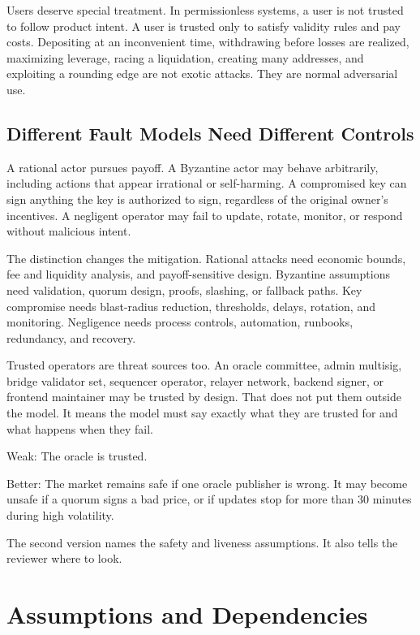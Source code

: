 Users deserve special treatment. In permissionless systems, a user is not trusted to follow product intent. A user is trusted only to satisfy validity rules and pay costs. Depositing at an inconvenient time, withdrawing before losses are realized, maximizing leverage, racing a liquidation, creating many addresses, and exploiting a rounding edge are not exotic attacks. They are normal adversarial use.

\subsection{Different Fault Models Need Different Controls}

A rational actor pursues payoff. A Byzantine actor may behave arbitrarily, including actions that appear irrational or self-harming. A compromised key can sign anything the key is authorized to sign, regardless of the original owner's incentives. A negligent operator may fail to update, rotate, monitor, or respond without malicious intent.

The distinction changes the mitigation. Rational attacks need economic bounds, fee and liquidity analysis, and payoff-sensitive design. Byzantine assumptions need validation, quorum design, proofs, slashing, or fallback paths. Key compromise needs blast-radius reduction, thresholds, delays, rotation, and monitoring. Negligence needs process controls, automation, runbooks, redundancy, and recovery.

Trusted operators are threat sources too. An oracle committee, admin multisig, bridge validator set, sequencer operator, relayer network, backend signer, or frontend maintainer may be trusted by design. That does not put them outside the model. It means the model must say exactly what they are trusted for and what happens when they fail.

\begin{codeblock}
Weak:
    The oracle is trusted.

Better:
    The market remains safe if one oracle publisher is wrong.
    It may become unsafe if a quorum signs a bad price, or if updates stop
    for more than 30 minutes during high volatility.
\end{codeblock}

The second version names the safety and liveness assumptions. It also tells the reviewer where to look.

\section{Assumptions and Dependencies}

